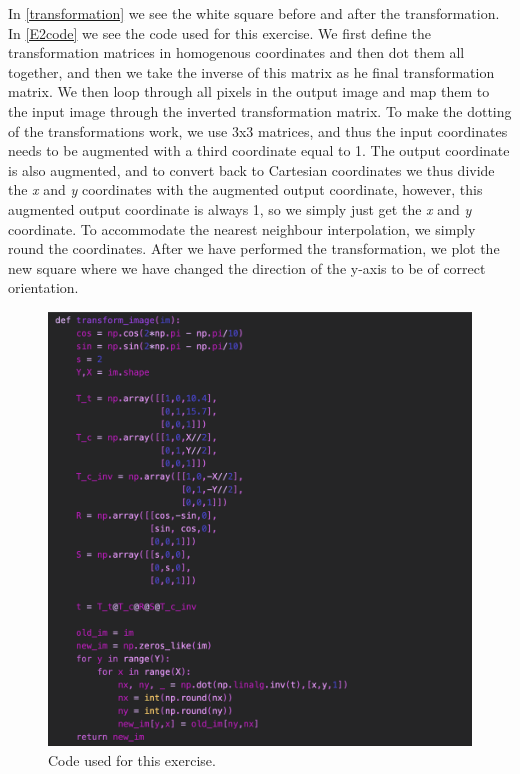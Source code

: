 In \autoref{transformation} we see the white square before and after the transformation. In \autoref{E2code} we see the code used for this exercise. We first define the transformation matrices in homogenous coordinates and then dot them all together, and then we take the inverse of this matrix as he final transformation matrix. We then loop through all pixels in the output image and map them to the input image through the inverted transformation matrix. To make the dotting of the transformations work, we use 3x3 matrices, and thus the input coordinates needs to be augmented with a third coordinate equal to 1. The output coordinate is also augmented, and to convert back to Cartesian coordinates we thus divide the \textit{x} and \textit{y} coordinates with the augmented output coordinate, however, this augmented output coordinate is always 1, so we simply just get the \textit{x} and \textit{y} coordinate. To accommodate the nearest neighbour interpolation, we simply round the coordinates. After we have performed the transformation, we plot the new square where we have changed the direction of the y-axis to be of correct orientation.

\begin{figure}[H]
	\centering
	\includegraphics[width=\linewidth]{Materials/E2/code}
	\caption{Code used for this exercise.}
	\label{E2code}
\end{figure}